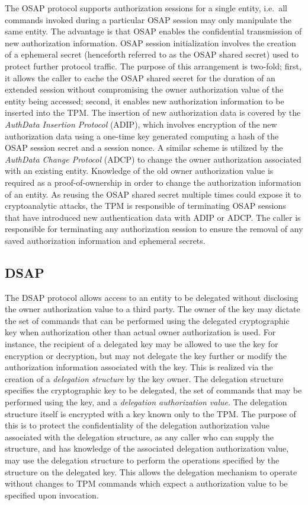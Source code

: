 \documentclass{sig-alternate-2013}
\begin{document}
The OSAP protocol supports authorization sessions for a single entity, i.e.\ all
commands invoked during a particular OSAP session may only manipulate the same
entity. The advantage is that OSAP enables the confidential transmission of new
authorization information. OSAP session initialization involves the creation of
a ephemeral secret (henceforth referred to as the OSAP shared secret) used to
protect further protocol traffic. The purpose of this arrangement is two-fold;
first, it allows the caller to cache the OSAP shared secret for the duration of
an extended session without compromising the owner authorization value of the
entity being accessed; second, it enables new authorization information to be
inserted into the TPM\@. The insertion of new authorization data is covered by
the \emph{AuthData Insertion Protocol} (ADIP), which involves encryption of the
new authorization data using a one-time key generated computing a hash of the
OSAP session secret and a session nonce. A similar scheme is utilized by the
\emph{AuthData Change Protocol} (ADCP) to change the owner authorization
associated with an existing entity. Knowledge of the old owner authorization
value is required as a proof-of-ownership in order to change the authorization
information of an entity. As reusing the OSAP shared secret multiple times could
expose it to cryptoanalytic attacks, the TPM is responsible of terminating OSAP
sessions that have introduced new authentication data with ADIP or ADCP\@. The
caller is responsible for terminating any authorization session to ensure the
removal of any saved authorization information and ephemeral secrets.

\subsection*{DSAP}

The DSAP protocol allows access to an entity to be delegated without disclosing
the owner authorization value to a third party. The owner of the key may dictate
the set of commands that can be performed using the delegated cryptographic key
when authorization other than actual owner authorization is used. For instance,
the recipient of a delegated key may be allowed to use the key for encryption or
decryption, but may not delegate the key further or modify the authorization
information associated with the key. This is realized via the creation of a
\emph{delegation structure} by the key owner. The delegation structure specifies
the cryptographic key to be delegated, the set of commands that may be performed
using the key, and a \emph{delegation authorization value}. The delegation
structure itself is encrypted with a key known only to the TPM\@. The purpose of
this is to protect the confidentiality of the delegation authorization value
associated with the delegation structure, as any caller who can supply the
structure, and has knowledge of the associated delegation authorization value,
may use the delegation structure to perform the operations specified by the
structure on the delegated key. This allows the delegation mechanism to operate
without changes to TPM commands which expect a authorization value to be
specified upon invocation.
\end{document}
